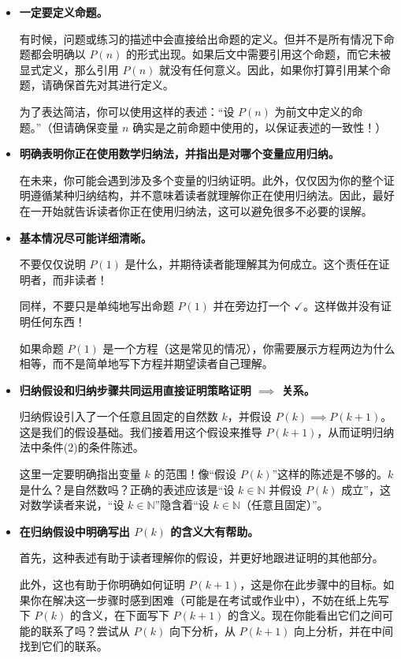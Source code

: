 \begin{itemize}
    \item \textbf{一定要定义命题。}
    
    有时候，问题或练习的描述中会直接给出命题的定义。但并不是所有情况下命题都会明确以 $P(n)$ 的形式出现。如果后文中需要引用这个命题，而它未被显式定义，那么引用 $P(n)$ 就没有任何意义。因此，如果你打算引用某个命题，请确保首先对其进行定义。

    为了表达简洁，你可以使用这样的表述：``设 $P(n)$ 为前文中定义的命题。''（但请确保变量 $n$ 确实是之前命题中使用的，以保证表述的一致性！）

    \item \textbf{明确表明你正在使用数学归纳法，并指出是对哪个变量应用归纳。}
    
    在未来，你可能会遇到涉及多个变量的归纳证明。此外，仅仅因为你的整个证明遵循某种归纳结构，并不意味着读者就理解你正在使用归纳法。因此，最好在一开始就告诉读者你正在使用归纳法，这可以避免很多不必要的误解。

    \item \textbf{基本情况尽可能详细清晰。}
    
    不要仅仅说明 $P(1)$ 是什么，并期待读者能理解其为何成立。这个责任在证明者，而非读者！

    同样，不要只是单纯地写出命题 $P(1)$ 并在旁边打一个 $\checkmark$。这样做并没有证明任何东西！

    如果命题 $P(1)$ 是一个方程（这是常见的情况），你需要展示方程两边为什么相等，而不是简单地写下方程并期望读者自己理解。

    \item \textbf{归纳假设和归纳步骤共同运用直接证明策略证明 $\implies$ 关系。}
    
    归纳假设引入了一个任意且固定的自然数 $k$，并假设 $P(k) \implies P(k+1)$。这是我们的假设基础。我们接着用这个假设来推导 $P(k+1)$，从而证明归纳法中条件(2)的条件陈述。

    这里一定要明确指出变量 $k$ 的范围！像``假设 $P(k)$''这样的陈述是不够的。$k$ 是什么？是自然数吗？正确的表述应该是``设 $k \in \mathbb{N}$ 并假设 $P(k)$ 成立''，这对数学读者来说，``设 $k \in \mathbb{N}$''隐含着``设 $k \in \mathbb{N}$（任意且固定）''。

    \item \textbf{在归纳假设中明确写出 $P(k)$ 的含义大有帮助。}
    
    首先，这种表述有助于读者理解你的假设，并更好地跟进证明的其他部分。

    此外，这也有助于你明确如何证明 $P(k+1)$，这是你在此步骤中的目标。如果你在解决这一步骤时感到困难（可能是在考试或作业中），不妨在纸上先写下 $P(k)$ 的含义，在下面写下 $P(k+1)$ 的含义。现在你能看出它们之间可能的联系了吗？尝试从 $P(k)$ 向下分析，从 $P(k+1)$ 向上分析，并在中间找到它们的联系。


\end{itemize}
